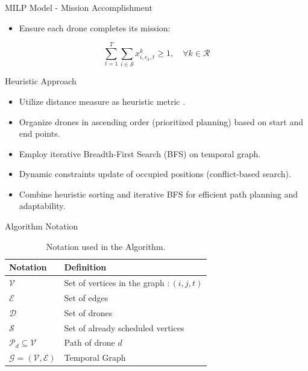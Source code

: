 \begin{frame}{MILP Model - Mission Accomplishment}
    \begin{itemize}
        \item Ensure each drone completes its mission:
    \end{itemize}
    \[
    \sum_{t=1}^{T}
    \sum_{i \in \mathcal{S}}
    x_{i,e_k,t}^k \geq 1, \quad \forall k \in \mathcal{R}
    \]
\end{frame}

\begin{frame}{Heuristic Approach}
        \begin{itemize}
            \item Utilize distance measure as heuristic metric \cite{Weise2023}.
            \item Organize drones in ascending order (prioritized planning) based on start and end points.
            \item Employ iterative Breadth-First Search (BFS) on temporal graph.
            \item Dynamic constraints update of occupied positions (conflict-based search).
            \item Combine heuristic sorting and iterative BFS for efficient path planning and adaptability.
        \end{itemize}
\end{frame}


\begin{frame}{Algorithm Notation}
    \begin{table}
      \centering
      \caption{Notation used in the Algorithm.}
      \label{tab:notation}
      \begin{tabular}{ll}
        \toprule
        Notation & Definition \\
        \midrule
        $\mathcal{V}$ &Set of vertices in the graph $: (i,j,t)$ \\
        $\mathcal{E}$ & Set of edges  \\
        $\mathcal{D}$ & Set of drones \\
        $\mathcal{S}$ & Set of already scheduled vertices \\
        $\mathcal{P}_d \subseteq \mathcal{V} $ & Path of drone $d$ \\
        $\mathcal{G} = (\mathcal{V},\mathcal{E}) $ & Temporal Graph \\
        \bottomrule
      \end{tabular}
    \end{table}
\end{frame}

